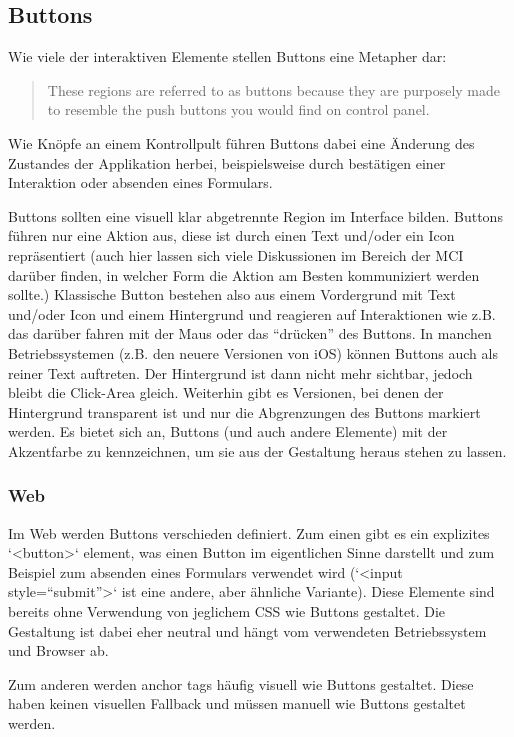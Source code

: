 \subsection{Buttons}

Wie viele der interaktiven Elemente stellen Buttons eine Metapher dar:

\begin{quote}
These regions are referred to as buttons because they are purposely made to resemble the push buttons you would find on control panel.
\end{quote}

Wie Knöpfe an einem Kontrollpult führen Buttons dabei eine Änderung des Zustandes der Applikation herbei, beispielsweise durch bestätigen einer Interaktion oder absenden eines Formulars.

Buttons sollten eine visuell klar abgetrennte Region im Interface bilden. Buttons führen nur eine Aktion aus, diese ist durch einen Text und/oder ein Icon repräsentiert (auch hier lassen sich viele Diskussionen im Bereich der MCI darüber finden, in welcher Form die Aktion am Besten kommuniziert werden sollte.)
Klassische Button bestehen also aus einem Vordergrund mit Text und/oder Icon und einem Hintergrund und reagieren auf Interaktionen wie z.B. das darüber fahren mit der Maus oder das “drücken” des Buttons.
In manchen Betriebssystemen (z.B. den neuere Versionen von iOS) können Buttons auch als reiner Text auftreten. Der Hintergrund ist dann nicht mehr sichtbar, jedoch bleibt die Click-Area gleich. Weiterhin gibt es Versionen, bei denen der Hintergrund transparent ist und nur die Abgrenzungen des Buttons markiert werden.
Es bietet sich an, Buttons (und auch andere Elemente) mit der Akzentfarbe zu kennzeichnen, um sie aus der Gestaltung heraus stehen zu lassen.

\subsubsection{Web}
Im Web werden Buttons verschieden definiert. Zum einen gibt es ein explizites `<button>` element, was einen Button im eigentlichen Sinne darstellt und zum Beispiel zum absenden eines Formulars verwendet wird (`<input style=“submit”>` ist eine andere, aber ähnliche Variante). Diese Elemente sind bereits ohne Verwendung von jeglichem CSS wie Buttons gestaltet. Die Gestaltung ist dabei eher neutral und hängt vom verwendeten Betriebssystem und Browser ab.

Zum anderen werden anchor tags häufig visuell wie Buttons gestaltet.  Diese haben keinen visuellen Fallback und müssen manuell wie Buttons gestaltet werden.




